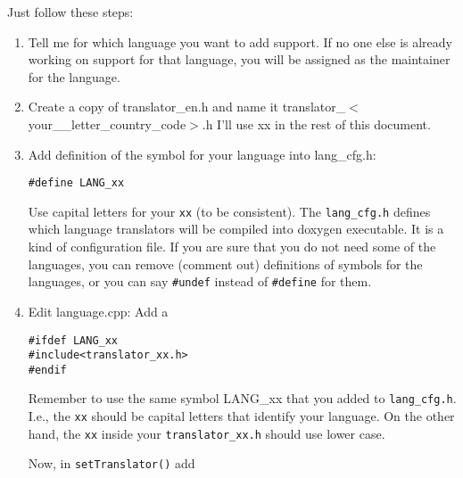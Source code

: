 Just follow these steps: \begin{enumerate}
\item Tell me for which language you want to add support. If no one else is already working on support for that language, you will be assigned as the maintainer for the language. \item Create a copy of translator\_\-en.h and name it translator\_\-$<$your\_\_\-letter\_\-country\_\-code$>$.h I'll use xx in the rest of this document. \item Add definition of the symbol for your language into lang\_\-cfg.h: 

\footnotesize\begin{verbatim}
#define LANG_xx
\end{verbatim}
\normalsize
 Use capital letters for your {\tt xx} (to be consistent). The {\tt lang\_\-cfg.h} defines which language translators will be compiled into doxygen executable. It is a kind of configuration file. If you are sure that you do not need some of the languages, you can remove (comment out) definitions of symbols for the languages, or you can say {\tt \#undef} instead of {\tt \#define} for them. \item Edit language.cpp: Add a 

\footnotesize\begin{verbatim}
#ifdef LANG_xx
#include<translator_xx.h>
#endif
\end{verbatim}
\normalsize
 Remember to use the same symbol LANG\_\-xx that you added to {\tt lang\_\-cfg.h}. I.e., the {\tt xx} should be capital letters that identify your language. On the other hand, the {\tt xx} inside your {\tt translator\_\-xx.h} should use lower case. 

Now, in {\tt setTranslator()} add 


\end{enumerate}
